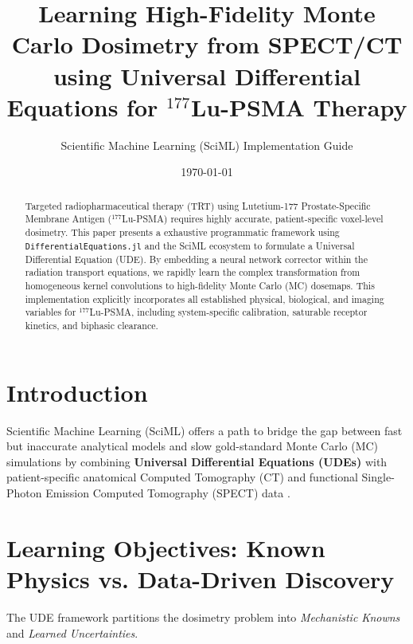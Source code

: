 \documentclass[11pt,a4paper]{article}
\title{\textbf{Learning High-Fidelity Monte Carlo Dosimetry from SPECT/CT using Universal Differential Equations for $^{177}$Lu-PSMA Therapy}}
\author{Scientific Machine Learning (SciML) Implementation Guide}
\date{\today}
\begin{document}
\maketitle

\begin{abstract}
Targeted radiopharmaceutical therapy (TRT) using Lutetium-177 Prostate-Specific Membrane Antigen ($^{177}$Lu-PSMA) requires highly accurate, patient-specific voxel-level dosimetry. This paper presents a exhaustive programmatic framework using \texttt{DifferentialEquations.jl} and the SciML ecosystem to formulate a Universal Differential Equation (UDE). By embedding a neural network corrector within the radiation transport equations, we rapidly learn the complex transformation from homogeneous kernel convolutions to high-fidelity Monte Carlo (MC) dosemaps. This implementation explicitly incorporates all established physical, biological, and imaging variables for $^{177}$Lu-PSMA, including system-specific calibration, saturable receptor kinetics, and biphasic clearance.
\end{abstract}

\section{Introduction}
Scientific Machine Learning (SciML) offers a path to bridge the gap between fast but inaccurate analytical models and slow gold-standard Monte Carlo (MC) simulations by combining \textbf{Universal Differential Equations (UDEs)} with patient-specific anatomical Computed Tomography (CT) and functional Single-Photon Emission Computed Tomography (SPECT) data \cite{KennedyLugassi2020}.

\section{Learning Objectives: Known Physics vs. Data-Driven Discovery}

The UDE framework partitions the dosimetry problem into \textit{Mechanistic Knowns} and \textit{Learned Uncertainties}.
\end{document}
